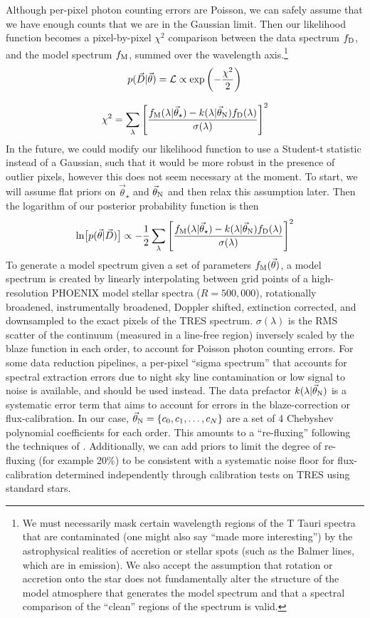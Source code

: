 \documentclass[preprint]{aastex} %
\newcommand{\vt}{\vec{\theta}}
\newcommand{\vstar}{\vt_{\star}}
\newcommand{\vN}{\vt_{\rm N}}
\newcommand{\fM}{f_{\rm M}}
\newcommand{\fD}{f_{\rm D}}
\newcommand{\vD}{\vec{D}}
\begin{document}
Although per-pixel photon counting errors are Poisson, we can safely assume that we have enough counts that we are in the Gaussian limit. Then our likelihood function becomes a pixel-by-pixel $\chi^2$ comparison between the data spectrum $\fD$, and the model spectrum $\fM$, summed over the wavelength axis.\footnote{We must necessarily mask certain wavelength regions of the T Tauri spectra that are contaminated (one might also say ``made more interesting'') by the astrophysical realities of accretion or stellar spots (such as the Balmer lines, which are in emission).  We also accept the assumption that rotation or accretion onto the star does not fundamentally alter the structure of the model atmosphere that generates the model spectrum and that a spectral comparison of the ``clean'' regions of the spectrum is valid.} 
\begin{equation}
 p(\vD | \vt) = {\cal L} \propto \exp \left(-\frac{\chi^2}{2} \right)
\end{equation}

\begin{equation}
  \chi^2 = \sum_\lambda \left [\frac{\fM(\lambda | \vstar) - k(\lambda | \vN) \fD(\lambda) }{\sigma(\lambda)} \right ]^2
\end{equation}
In the future, we could modify our likelihood function to use a Student-t statistic instead of a Gaussian, such that it would be more robust in the presence of outlier pixels, however this does not seem necessary at the moment. To start, we will assume flat priors on $\vstar$ and $\vN$ and then relax this assumption later. Then the logarithm of our posterior probability function is then
\begin{equation}
  \ln \bigl [p(\vt | \vD) \bigr] \propto - \frac{1}{2} \sum_\lambda \left [\frac{\fM(\lambda | \vstar) - k(\lambda | \vN) \fD(\lambda) }{\sigma(\lambda)} \right ]^2
  \label{eqn:lnprob}
\end{equation}
To generate a model spectrum given a set of parameters $\fM(\vt)$, a model spectrum is created by linearly interpolating between grid points of a high-resolution PHOENIX model stellar spectra ($R = 500,000$), rotationally broadened, instrumentally broadened, Doppler shifted, extinction corrected, and downsampled to the exact pixels of the TRES spectrum. $\sigma(\lambda)$ is the RMS scatter of the continuum (measured in a line-free region) inversely scaled by the blaze function in each order, to account for Poisson photon counting errors. For some data reduction pipelines, a per-pixel ``sigma spectrum'' that accounts for spectral extraction errors due to night sky line contamination or low signal to noise is available, and should be used instead. The data prefactor $k(\lambda | \vN)$ is a systematic error term that aims to account for errors in the blaze-correction or flux-calibration. In our case, $\vN = \{c_0, c_1, \ldots, c_N\}$ are a set of 4 Chebyshev polynomial coefficients for each order. This amounts to a ``re-fluxing'' following the techniques of \citet{elh+06}. Additionally, we can add priors to limit the degree of re-fluxing (for example 20\%) to be consistent with a systematic noise floor for flux-calibration determined independently through calibration tests on TRES using standard stars.
\end{document}

